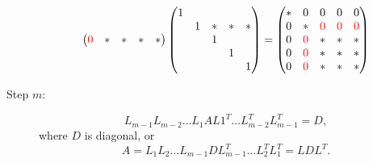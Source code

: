 \documentclass[computationalMathematics.tex]{subfiles}
\begin{document}
\begin{description}
\[\begin{pmatrix}
    {\color{red} 0} & \ast & \ast & \ast & \ast\\
\end{pmatrix}
\begin{pmatrix}
    1\\
    & 1 & \ast & \ast & \ast\\
    & & 1\\
    & & & 1\\
    & & & &1\\
\end{pmatrix}
=
\begin{pmatrix}
	\ast & 0 & 0 & 0 & 0\\
	0 & \ast & {\color{red} 0} & {\color{red} 0} & {\color{red} 0}\\
	0 & {\color{red} 0} & \ast & \ast & \ast\\
	0 & {\color{red} 0} & \ast & \ast & \ast\\
	0 & {\color{red} 0} & \ast & \ast & \ast\\
\end{pmatrix}
\]

\item[{\sc Step $m$:}] 
  \[
L_{m-1}L_{m-2}\dots L_1 A L1^T \dots L_{m-2}^T L_{m-1}^T = D,
\]
where $D$ is diagonal, or
\[
A = L_1 L_2 \dots L_{m-1} D L_{m-1}^T \dots L_2^T L_1^T = LDL^T.
\]
\end{description}
\end{document}
